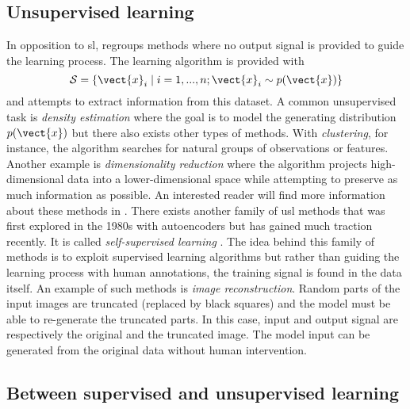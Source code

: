 \subsection{Unsupervised learning}
\label{ssec:backml:usl}

In opposition to \acrlong{sl},  regroups methods where no output
signal is provided to guide the learning process. The learning algorithm is provided
with
\begin{equation}
\mathcal{S} = \left\{\vect{x}_i \mid i = 1,..., n ; \vect{x}_i \sim p(\vect{x})\right\}
\end{equation}
and attempts to extract information from this dataset. A common unsupervised task
is \textit{density estimation} where the goal is to model the generating distribution
$p(\vect{x})$ but there also exists other types of methods. With \textit{clustering},
for instance, the algorithm searches for natural groups of observations or features.
Another example is \textit{dimensionality reduction} where the algorithm projects
high-dimensional data into a lower-dimensional space while attempting to preserve
as much information as possible. An interested reader will find more information
about these methods in \parencite{friedman2017elements}. There exists another
family of \acrlong{usl} methods that was first explored in the 1980s with autoencoders
but has gained much traction recently. It is called \textit{self-supervised learning}
\parencite{lecun2021self}. The idea behind this family of methods is to exploit
supervised learning algorithms but rather than guiding the learning process with
human annotations, the training signal is found in the data itself. An example of
such methods is \textit{image reconstruction}. Random parts of the input images
are truncated (\eg replaced by black squares) and the model must be able to
re-generate the truncated parts. In this case, input and output signal are
respectively the original and the truncated image. The model input can be generated
from the original data without human intervention.

\subsection{Between supervised and unsupervised learning}
\label{ssec:backml:inbetween}

